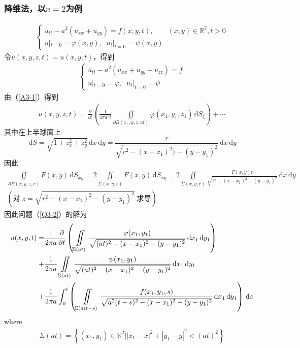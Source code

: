 \documentclass[11pt, a4paper]{article}
\theoremstyle{theorem}
\newcommand{\intd}[1]{\,\mathrm{d}{#1}}
\begin{document}
\subsubsection{降维法，以$n=2$为例}

\begin{align}
\label{Q3-2}
    \begin{cases}
    u_{tt} - a^2 (u_{xx} + u_{yy}) = f(x,y,t), \quad \quad (x,y) \in \mathbb{R}^2, t > 0\\
    u|_{t = 0} = \varphi(x,y), \; \; u_t|_{t = 0} = \psi(x,y)
    \end{cases}
\end{align}
令$\overline{u}(x,y,z,t) = u(x,y,t)$，得到
\begin{align}
    \begin{cases}
    \overline{u}_{tt} - a^2 (\overline{u}_{xx} + \overline{u}_{yy}+\overline{u}_{zz}) = \overline{f} \\
    \overline{u}|_{t = 0} = \overline{\varphi}, \; \; \overline{u}_t|_{t = 0} = \overline{\psi}
    \end{cases}
\end{align}
由（\ref{A3-1}）得到
\begin{align}
    \overline{u}(x,y,z,t) = \frac{\partial}{\partial t} \left(\frac{1}{4 \pi a^2 t} \iint\limits_{\partial B(x,,y,z,at)} \overline{\varphi}(x_1,y_1,z_1) \intd S_\xi\right) + \cdots
\end{align}
其中在上半球面上
$$
\intd S = \sqrt{1 + z_x^2 + z_y^2} \intd x \intd y = \frac{r}{\sqrt{r^2 - (x-x_1)^2) - (y - y_1)^2}} \intd x \intd y
$$
因此
\begin{align*}
\iint\limits_{\partial B(x,y,z,r)} F(x,y) \intd S_{xy} = 2 \iint\limits_{\Sigma(x,y,r)} F(x,y) \intd S_{xy} = 2 \iint\limits_{\Sigma(x,y,r)} \frac{F(x,y)r}{\sqrt{r^2 - (x-x_1)^2 - (y - y_1)^2}} \intd x \intd y \\
\left(\text{对}\; z = \sqrt{r^2 - (x-x_1)^2 - (y - y_1)^2} \; \text{求导}\right)
\end{align*}
因此问题（\ref{Q3-2}）的解为
\begin{align}
\label{A3-2}
    u(x,y,t) = &\frac{1}{2\pi a}\frac{\partial}{\partial t} \left( \iint\limits_{\Sigma(at)} \frac{\varphi(x_1,y_1)}{\sqrt{(at)^2 - (x-x_1)^2 - (y - y_1)^2}}\intd x_1 \intd y_1\right) \notag \\
    + &\frac{1}{2\pi a} \iint\limits_{\Sigma(at)} \frac{\psi(x_1,y_1)}{\sqrt{(at)^2 - (x-x_1)^2 - (y - y_1)^2}}\intd x_1 \intd y_1 \notag \\
    + &\frac{1}{2\pi a} \int_0^t \left(\iint\limits_{\Sigma(a(t-s)} \frac{f(x_1,y_1,s)}{\sqrt{a^2(t-s)^2 - (x-x_1)^2 - (y - y_1)^2}}\intd x_1 \intd y_1\right) \intd s
\end{align}
where
\begin{align*}
\Sigma(at) = \left\{(x_1,y_1) \in \mathbb{R}^2 \Bigg| |x_1 - x|^2 + |y_1 - y|^2 < (at)^2 \right\}
\end{align*}
\end{document}

